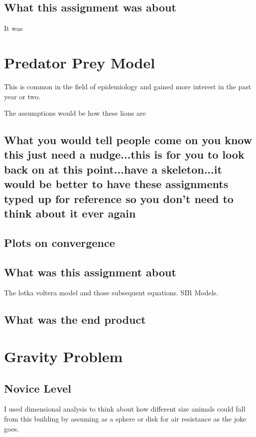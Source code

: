 \subsection{What this assignment was about}

It was





\section{Predator Prey Model}

This is common in the field of epidemiology and gained more interest in the past year or two. 

The assumptions would be how these lions are 


\subsection{What you would tell people come on you know this just need a nudge...this is for you to look back on at this point...have a skeleton...it would be better to have these assignments typed up for reference so you don't need to think about it ever again}


\subsection{Plots on convergence}




\subsection{What was this assignment about}
The lotka voltera model and those subsequent equations. SIR Models. 

\subsection{What was the end product}




\section{Gravity Problem}


\subsection{Novice Level}
I used dimensional analysis to think about how different size animals could fall from this building by assuming as a sphere or disk for air resistance as the joke goes. 


